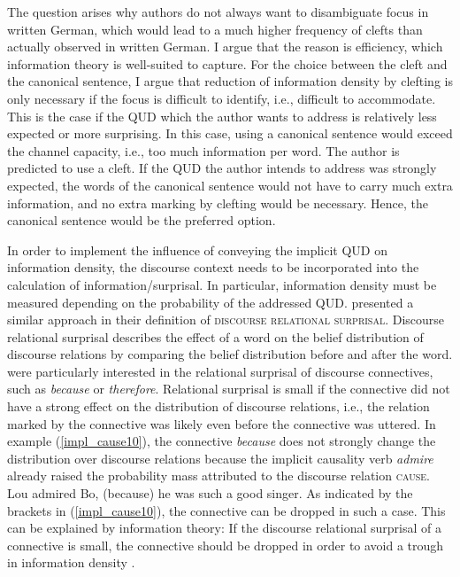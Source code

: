 \documentclass[output=paper,colorlinks,citecolor=brown]{langscibook}
\begin{document}
The question arises why authors do not always want to disambiguate focus in written German, which would lead to a much higher frequency of clefts than actually observed in written German. I argue that the reason is efficiency, which information theory is well-suited to capture. For the choice between the cleft and the canonical sentence, I argue that reduction of information density by clefting is only necessary if the focus is difficult to identify, i.e., difficult to accommodate. This is the case if the QUD which the author wants to address is relatively less expected or more surprising. In this case, using a canonical sentence would exceed the channel capacity, i.e., too much information per word. The author is predicted to use a cleft. 
If the QUD the author intends to address was strongly expected, the words of the canonical sentence would not have to carry much extra information, and no extra marking by clefting would be necessary. Hence, the canonical sentence would be the preferred option.

In order to implement the influence of conveying the implicit QUD on information density, the discourse context needs to be incorporated into the calculation of information/surprisal. In particular, information density must be measured depending on the probability of the addressed QUD. \citet{asr_demberg_2015} presented a similar approach in their definition of \textsc{discourse relational surprisal}. Discourse relational surprisal describes the effect of a word on the belief distribution of discourse relations by comparing the belief distribution before and after the word. \citet{asr_demberg_2015} were particularly interested in the relational surprisal of discourse connectives, such as \textit{because} or \textit{therefore}. Relational surprisal is small if the connective did not have a strong effect on the distribution of discourse relations, i.e., the relation marked by the connective was likely even before the connective was uttered. In example (\ref{impl_cause10}), the connective \textit{because} does not strongly change the distribution over discourse relations because the implicit causality verb \textit{admire} already raised the probability mass attributed to the discourse relation \textsc{cause}.
\ea\label{impl_cause10}Lou admired Bo, (because) he was such a good singer.
\z
As indicated by the brackets in (\ref{impl_cause10}), the connective can be dropped in such a case. This can be explained by information theory: If the discourse relational surprisal of a connective is small, the connective should be dropped in order to avoid a trough in information density \citep{levy_2008, demberg_keller_2008,asr_demberg_2012,asr_demberg_2015}.
 
\end{document}
